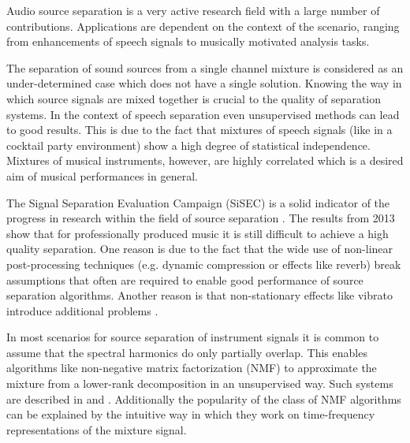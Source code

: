 



Audio source separation is a very active research field with a large number of contributions. Applications are dependent on the context of the scenario, ranging from enhancements of speech signals to musically motivated analysis tasks.


The separation of sound sources from a single channel mixture is considered as an under-determined case which does not have a single solution. Knowing the way in which source signals are mixed together is crucial to the quality of separation systems. In the context of speech separation even unsupervised methods can lead to good results. This is due to the fact that mixtures of speech signals (like in a cocktail party environment) show a high degree of statistical independence. Mixtures of musical instruments, however, are highly correlated which is a desired aim of musical performances in general.

The Signal Separation Evaluation Campaign (SiSEC) is a solid indicator of the progress in research within the field of source separation \cite{vincent2012signal}. The results from 2013 \cite{sisec2013} show that for professionally produced music it is still difficult to achieve a high quality separation.
One reason is due to the fact that the wide use of non-linear post-processing techniques (e.g. dynamic compression or effects like reverb) break assumptions that often are required to enable good performance of source separation algorithms. Another reason is that non-stationary effects like vibrato introduce additional problems \cite{nakano2010nonnegative}.

In most scenarios for source separation of instrument signals it is common to assume that the spectral harmonics do only partially overlap. This enables algorithms like non-negative matrix factorization (NMF) to approximate the mixture from a lower-rank decomposition in an unsupervised way. Such systems are described in \cite{smaragdis2003non} and \cite{virtanen2007monaural}. Additionally the popularity of the class of NMF algorithms can be explained by the intuitive way in which they work on time-frequency representations of the mixture signal.

